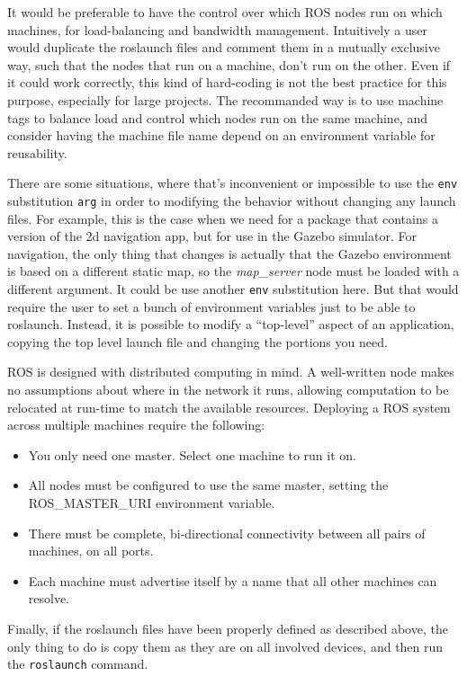 It would be preferable to have the control over which ROS nodes run on which machines, for load-balancing and bandwidth management.
Intuitively a user would duplicate the roslaunch files and comment them in a mutually exclusive way, such that the nodes that run on a machine, don't run on the other. Even if it could work correctly, this kind of hard-coding is not the best practice for this purpose, especially for large projects. The recommanded way is to use machine tags to balance load and control which nodes run on the same machine, and consider having the machine file name depend on an environment variable for reusability.

There are some situations, where that's inconvenient or impossible to use the \texttt{env} substitution \texttt{arg} in order to modifying the behavior without changing any launch files. For example, this is the case when we need for a package that contains a version of the 2d navigation app, but for use in the Gazebo simulator.
For navigation, the only thing that changes is actually that the Gazebo environment is based on a different static map, so the \textit{map\_server} node must be loaded with a different argument. It could be use another \texttt{env} substitution here. But that would require the user to set a bunch of environment variables just to be able to roslaunch. 
Instead, it is possible to modify a ``top-level'' aspect of an application, copying the top level launch file and changing the portions you need. 


ROS is designed with distributed computing in mind. A well-written node makes no assumptions about where in the network it runs, allowing computation to be relocated at run-time to match the available resources. Deploying a ROS system across multiple machines require the following:

\begin{itemize}
	\item You only need one master. Select one machine to run it on.
	\item All nodes must be configured to use the same master, setting the ROS\_MASTER\_URI environment variable.
	\item There must be complete, bi-directional connectivity between all pairs of machines, on all ports.
	\item Each machine must advertise itself by a name that all other machines can resolve.
\end{itemize}  

Finally, if the roslaunch files have been properly defined as described above, the only thing to do is copy them as they are on all involved devices, and then run the \texttt{roslaunch} command.


